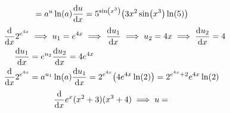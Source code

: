 \documentclass{article}
\begin{document}
\begin{tasks}[style = enumerate]
\begin{align*}
						&= a^u\ln(a)\dv{u}{x}
							= 5^{\sin(x^3)}\qty(3x^2\sin(x^3)\ln(5))
				\end{align*}
			\task
				\begin{align*}
					\dv{x} 2^{e^{4x}} &\implies u_1 = e^{4x}
						\implies \dv{u_1}{x} \implies u_2 = 4x
							\implies \dv{u_2}{x} = 4 \\
					\dv{u_1}{x} &= e^{u_2}\dv{u_2}{x}
							= 4e^{4x} \\
					\dv{x} 2^{e^{4x}} &= a^{u_1}\ln(a)\dv{u_1}{x}
						= 2^{e^{4x}}\qty(4e^{4x}\ln(2))
						= 2^{e^{4x} + 2}e^{4x}\ln(2)
				\end{align*}
			\task
				\begin{align*}
					\dv{x} e^x(x^2 + 3)(x^3 + 4) &\implies u = 
				\end{align*}

		\end{tasks}
\end{document}
